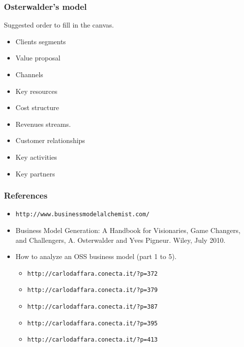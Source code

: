 \begin{frame}
\frametitle{Osterwalder's model}
Suggested order to fill in the canvas.
\begin{itemize}
 \item Clients segments
 \item Value proposal
 \item Channels
 \item Key resources
 \item Cost structure
 \item Revenues streams.
 \item Customer relationships
 \item Key activities
 \item Key partners
\end{itemize}

\end{frame}

\begin{frame}
 \frametitle{References}
\begin{itemize}
 \item \texttt{http://www.businessmodelalchemist.com/} 
 \item Business Model Generation: A Handbook for Visionaries, Game Changers, and Challengers, A. Osterwalder and Yves Pigneur. Wiley, July 2010.
 \item How to analyze an OSS business model (part 1 to 5).
  \begin{itemize}
   \item \texttt{http://carlodaffara.conecta.it/?p=372}
   \item \texttt{http://carlodaffara.conecta.it/?p=379}
   \item \texttt{http://carlodaffara.conecta.it/?p=387}
   \item \texttt{http://carlodaffara.conecta.it/?p=395}
   \item \texttt{http://carlodaffara.conecta.it/?p=413}
  \end{itemize}

\end{itemize}

  
 
 

\end{frame}

